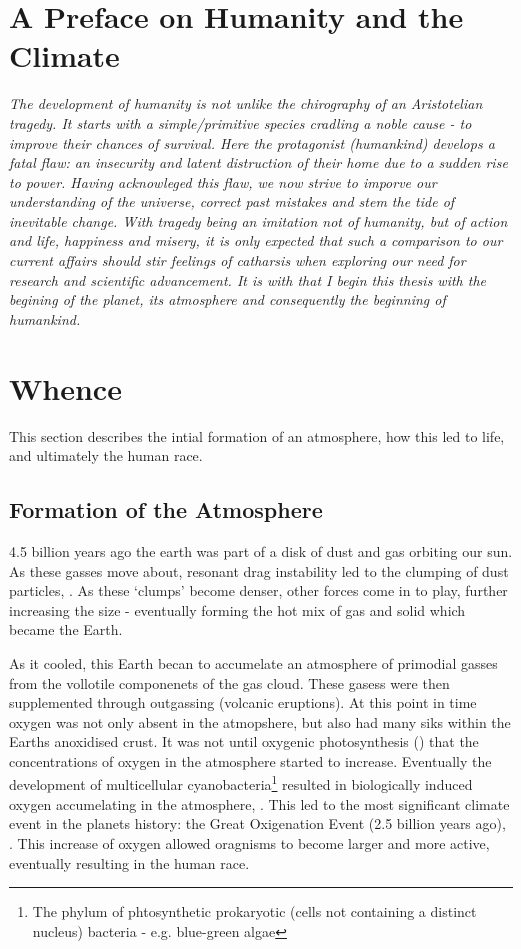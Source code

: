 

\section*{A Preface on Humanity and the Climate}
\begin{flushleft}\emph{
The development of humanity is not unlike the chirography of an Aristotelian tragedy. It starts with a simple/primitive species cradling a noble cause - to improve their chances of survival. Here the protagonist (humankind) develops a fatal flaw: an insecurity and latent distruction of their home due to a sudden rise to power. 
Having acknowleged this flaw, we now strive to imporve our understanding of the universe, correct past mistakes and stem the tide of inevitable change. \vspace{\baselineskip}\linebreak
With tragedy being an imitation not of humanity, but of action and life, happiness and misery, it is only expected that such a comparison to our current affairs should stir feelings of catharsis when exploring our need for research and scientific advancement. 
It is with that I begin this thesis with the begining of the planet, its atmosphere and consequently the beginning of humankind. 
}
\end{flushleft}

\section{Whence} 
This section describes the intial formation of an atmosphere, how this led to life, and ultimately the human race. 
\subsection{Formation of the Atmosphere}
 4.5 billion years ago the earth was part of a disk of dust and gas orbiting our sun. As these gasses move about, resonant drag instability led to the clumping of dust particles, \cite{drag,planet}. As these `clumps' become denser, other forces come in to play, further increasing the size - eventually forming the hot mix of gas and solid which became the Earth. 

As it cooled, this Earth becan to accumelate an atmosphere of primodial gasses from the vollotile componenets of the gas cloud. These gasess were then supplemented through outgassing (volcanic eruptions). At this point in time oxygen was not only absent in the atmopshere, but also had many siks within the Earths anoxidised crust. It was not until oxygenic photosynthesis (\cite{oxygenicphotosynthesis}) that the concentrations of oxygen in the atmosphere started to increase. Eventually the development of multicellular cyanobacteria\footnote{The phylum of phtosynthetic prokaryotic (cells not containing a distinct nucleus) bacteria - e.g. blue-green algae} resulted in biologically induced oxygen accumelating in the atmosphere, \cite{multicellular}. This led to the most significant climate event in the planets history: the Great Oxigenation Event (2.5 billion years ago), \cite{oxidation}. This increase of oxygen allowed oragnisms to become larger and more active, eventually resulting in the human race. 

